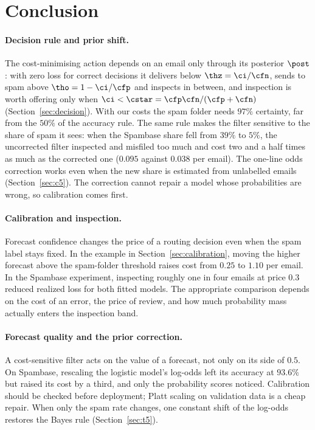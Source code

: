 \section{Conclusion}
\label{sec:conclusion}
\paragraph{Decision rule and prior shift.}
The cost-minimising action depends on an email only through its posterior $\post$: with zero loss for
correct decisions it delivers below $\thz=\ci/\cfn$, sends to spam above $\tho=1-\ci/\cfp$ and
inspects in between, and inspection is worth offering only when $\ci<\cstar=\cfp\cfn/(\cfp+\cfn)$
(Section~\ref{sec:decision}). With our costs the spam folder needs $97\%$ certainty, far from the
$50\%$ of the accuracy rule. The same rule makes the filter sensitive to the share of spam it sees:
when the Spambase share fell from $39\%$ to $5\%$, the uncorrected filter inspected and misfiled too much
and cost two and a half times as much as the corrected one ($0.095$ against $0.038$ per email). The
one-line odds correction works even when the new share is estimated from unlabelled emails
(Section~\ref{sec:c5}). The correction cannot repair a model
whose probabilities are wrong, so calibration comes first.

\paragraph{Calibration and inspection.}
Forecast confidence changes the price of a routing decision even when the spam label stays
fixed. In the example in Section~\ref{sec:calibration}, moving the higher forecast above
the spam-folder threshold raises cost from $0.25$ to $1.10$ per email. In the Spambase
experiment, inspecting roughly one in four emails at price $0.3$ reduced realized loss for
both fitted models. The appropriate comparison depends on the cost of an error, the price of
review, and how much probability mass actually enters the inspection band.

\paragraph{Forecast quality and the prior correction.}
A cost-sensitive filter acts on the value of a forecast, not only on its side of $0.5$. On Spambase,
rescaling the logistic model's log-odds left its accuracy at $93.6\%$ but raised its cost by a third, and only
the probability scores noticed. Calibration should be checked before deployment; Platt scaling on validation
data is a cheap repair. When only the spam rate changes, one constant shift of the log-odds restores the
Bayes rule (Section~\ref{sec:t5}).


